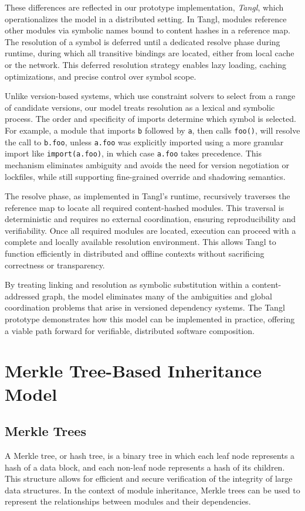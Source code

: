 \documentclass[sigplan,screen]{acmart}
\begin{document}
These differences are reflected in our prototype implementation, \textit{Tangl}, which operationalizes the model in a distributed setting. In Tangl, modules reference other modules via symbolic names bound to content hashes in a reference map. The resolution of a symbol is deferred until a dedicated resolve phase during runtime, during which all transitive bindings are located, either from local cache or the network. This deferred resolution strategy enables lazy loading, caching optimizations, and precise control over symbol scope.

Unlike version-based systems, which use constraint solvers to select from a range of candidate versions, our model treats resolution as a lexical and symbolic process. The order and specificity of imports determine which symbol is selected. For example, a module that imports \texttt{b} followed by \texttt{a}, then calls \texttt{foo()}, will resolve the call to \texttt{b.foo}, unless \texttt{a.foo} was explicitly imported using a more granular import like \texttt{import(a.foo)}, in which case \texttt{a.foo} takes precedence. This mechanism eliminates ambiguity and avoids the need for version negotiation or lockfiles, while still supporting fine-grained override and shadowing semantics.

The resolve phase, as implemented in Tangl's runtime, recursively traverses the reference map to locate all required content-hashed modules. This traversal is deterministic and requires no external coordination, ensuring reproducibility and verifiability. Once all required modules are located, execution can proceed with a complete and locally available resolution environment. This allows Tangl to function efficiently in distributed and offline contexts without sacrificing correctness or transparency.

By treating linking and resolution as symbolic substitution within a content-addressed graph, the model eliminates many of the ambiguities and global coordination problems that arise in versioned dependency systems. The Tangl prototype demonstrates how this model can be implemented in practice, offering a viable path forward for verifiable, distributed software composition.

\section{Merkle Tree-Based Inheritance Model}
\subsection{Merkle Trees}
A Merkle tree, or hash tree, is a binary tree in which each leaf node represents a hash of a data block, and each non-leaf node represents a hash of its children. This structure allows for efficient and secure verification of the integrity of large data structures. In the context of module inheritance, Merkle trees can be used to represent the relationships between modules and their dependencies.
\end{document}
